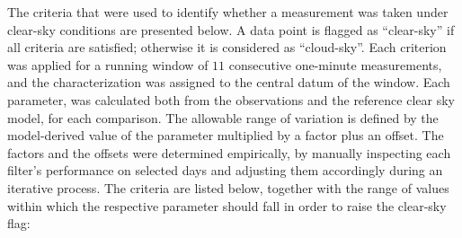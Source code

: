 \documentclass[applsci,article,submit,moreauthors,pdftex]{Definitions/mdpi}
\begin{document}
The criteria that were used to identify whether a measurement was taken
under clear-sky conditions are presented below. A data point is flagged
as ``clear-sky'' if all criteria are satisfied; otherwise it is
considered as ``cloud-sky''. Each criterion was applied for a running
window of \(11\) consecutive one-minute measurements, and the
characterization was assigned to the central datum of the window. Each
parameter, was calculated both from the observations and the reference
clear sky model, for each comparison. The allowable range of variation
is defined by the model-derived value of the parameter multiplied by a
factor plus an offset. The factors and the offsets were determined
empirically, by manually inspecting each filter's performance on
selected days and adjusting them accordingly during an iterative
process. The criteria are listed below, together with the range of
values within which the respective parameter should fall in order to
raise the clear-sky flag:
\end{document}
